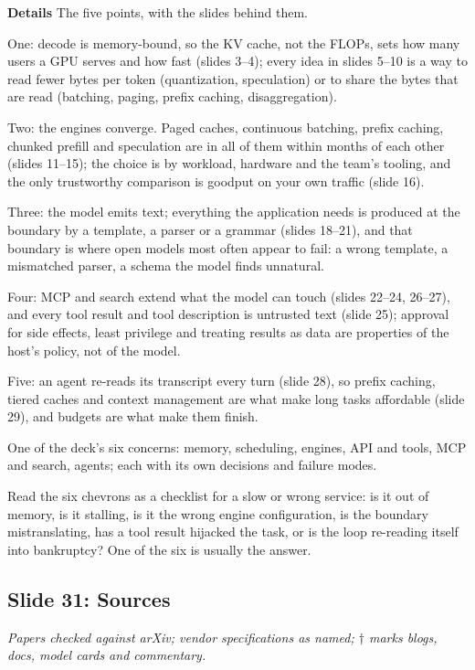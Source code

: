 \documentclass[11pt,letterpaper]{article}
\newcommand{\slide}[3]{%
  \subsection[Slide #1: #2]{Slide #1: #2}%
  {\color{muted}\itshape #3\par}\medskip}
\newcommand{\para}[1]{\medskip\noindent\textbf{#1}\quad}
\newenvironment{terms}{\begin{tcolorbox}[termsbox]\begin{description}[leftmargin=1.1em,itemsep=3pt,topsep=2pt,font=\normalfont]}{\end{description}\end{tcolorbox}}
\newcommand{\term}[2]{\item[\textbf{#1}]\index{#1} #2}
\newenvironment{intuition}{\begin{tcolorbox}[intuitionbox]}{\end{tcolorbox}}
\begin{document}
\para{Details} The five points, with the slides behind them.

One: decode is memory-bound, so the KV cache, not the FLOPs, sets how many users a GPU serves and how fast (slides 3--4); every idea in slides 5--10 is a way to read fewer bytes per token (quantization, speculation) or to share the bytes that are read (batching, paging, prefix caching, disaggregation).

Two: the engines converge. Paged caches, continuous batching, prefix caching, chunked prefill and speculation are in all of them within months of each other (slides 11--15); the choice is by workload, hardware and the team's tooling, and the only trustworthy comparison is goodput on your own traffic (slide 16).

Three: the model emits text; everything the application needs is produced at the boundary by a template, a parser or a grammar (slides 18--21), and that boundary is where open models most often appear to fail: a wrong template, a mismatched parser, a schema the model finds unnatural.

Four: MCP and search extend what the model can touch (slides 22--24, 26--27), and every tool result and tool description is untrusted text (slide 25); approval for side effects, least privilege and treating results as data are properties of the host's policy, not of the model.

Five: an agent re-reads its transcript every turn (slide 28), so prefix caching, tiered caches and context management are what make long tasks affordable (slide 29), and budgets are what make them finish.

\begin{terms}
\term{layer (runtime)}{One of the deck's six concerns: memory, scheduling, engines, API and tools, MCP and search, agents; each with its own decisions and failure modes.}
\end{terms}

\begin{intuition}
Read the six chevrons as a checklist for a slow or wrong service: is it out of memory, is it stalling, is it the wrong engine configuration, is the boundary mistranslating, has a tool result hijacked the task, or is the loop re-reading itself into bankruptcy? One of the six is usually the answer.
\end{intuition}

\slide{31}{Sources}{Papers checked against arXiv; vendor specifications as named; $\dagger$ marks blogs, docs, model cards and commentary.}
\end{document}
